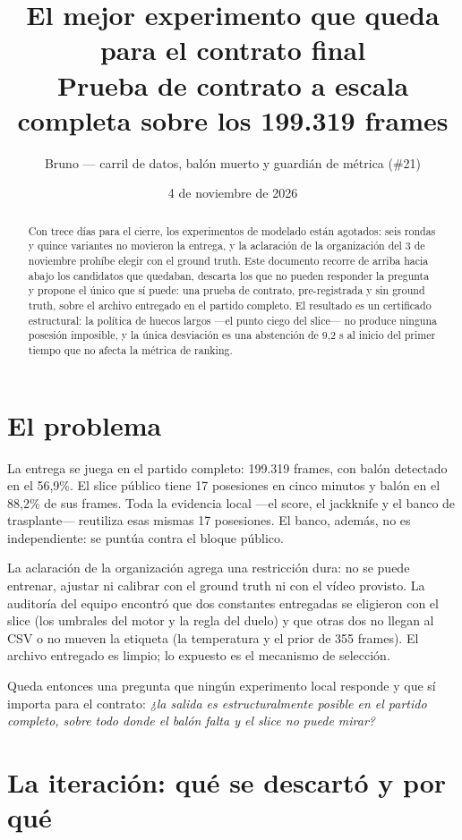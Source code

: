 \documentclass[11pt,a4paper]{article}
\title{El mejor experimento que queda para el contrato final\\
\large Prueba de contrato a escala completa sobre los 199.319 frames}
\author{Bruno --- carril de datos, bal\'on muerto y guardi\'an de m\'etrica (\#21)}
\date{4 de noviembre de 2026}
\begin{document}
\maketitle

\begin{abstract}
Con trece d\'ias para el cierre, los experimentos de modelado est\'an agotados: seis rondas y
quince variantes no movieron la entrega, y la aclaraci\'on de la organizaci\'on del 3 de noviembre
proh\'ibe elegir con el ground truth. Este documento recorre de arriba hacia abajo los candidatos que
quedaban, descarta los que no pueden responder la pregunta y propone el \'unico que s\'i puede:
una prueba de contrato, pre-registrada y sin ground truth, sobre el archivo entregado en el partido
completo. El resultado es un certificado estructural: la pol\'itica de huecos largos ---el punto
ciego del slice--- no produce ninguna posesi\'on imposible, y la \'unica desviaci\'on es una
abstenci\'on de 9,2 s al inicio del primer tiempo que no afecta la m\'etrica de ranking.
\end{abstract}

\section{El problema}

La entrega se juega en el partido completo: 199.319 frames, con bal\'on detectado en el 56,9\%.
El slice p\'ublico tiene 17 posesiones en cinco minutos y bal\'on en el 88,2\% de sus frames. Toda la
evidencia local ---el score, el jackknife y el banco de trasplante--- reutiliza esas mismas 17
posesiones. El banco, adem\'as, no es independiente: se punt\'ua contra el bloque p\'ublico.

La aclaraci\'on de la organizaci\'on agrega una restricci\'on dura: no se puede entrenar, ajustar ni
calibrar con el ground truth ni con el v\'ideo provisto. La auditor\'ia del equipo encontr\'o que dos
constantes entregadas se eligieron con el slice (los umbrales del motor y la regla del duelo) y que
otras dos no llegan al CSV o no mueven la etiqueta (la temperatura y el prior de 355 frames). El
archivo entregado es limpio; lo expuesto es el mecanismo de selecci\'on.

Queda entonces una pregunta que ning\'un experimento local responde y que s\'i importa para el
contrato: \emph{¿la salida es estructuralmente posible en el partido completo, sobre todo donde el
bal\'on falta y el slice no puede mirar?}

\section{La iteraci\'on: qu\'e se descart\'o y por qu\'e}
\end{document}
